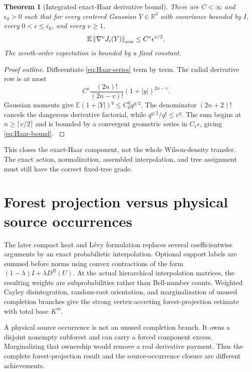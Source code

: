 \documentclass[11pt,oneside,openany]{book}
\newtheorem{theorem}{Theorem}[chapter]
\theoremstyle{definition}
\theoremstyle{remark}
\newcommand{\R}{\mathbb R}
\newcommand{\E}{\mathbb E}
\newcommand{\norm}[1]{\left\lVert#1\right\rVert}
\newcommand{\src}[2]{\cite[#2]{#1}}
\begin{document}
\begin{theorem}[Integrated exact-Haar derivative bound]\label{thm:Haar}
There are $C<\infty$ and $\epsilon_0>0$ such that for every centered Gaussian $Y\in\R^3$ with covariance bounded by $I$, every $0<\epsilon\le\epsilon_0$, and every $v\ge1$,
\begin{equation}\label{eq:Haar-bound}
\E\norm{\nabla^vJ_\epsilon(Y)}_{\rm row}
\le C^v\epsilon^{v/2}.
\end{equation}
The zeroth-order expectation is bounded by a fixed constant.
\end{theorem}
\begin{proof}[Proof outline]
Differentiate \cref{eq:Haar-series} term by term. The radial derivative row is at most
\[
C^v\frac{(2n)!}{(2n-v)!}(1+|y|)^{2n-v}.
\]
Gaussian moments give $\E(1+|Y|)^q\le C_0^q q^{q/2}$. The denominator $(2n+2)!$ cancels the dangerous derivative factorial, while $q^{q/2}/q!\le e^q$. The sum begins at $n\ge\lceil v/2\rceil$ and is bounded by a convergent geometric series in $C_1\epsilon$, giving \cref{eq:Haar-bound}. \src{F5}{V12}
\end{proof}

This closes the exact-Haar component, not the whole Wilson-density transfer. The exact action, normalization, assembled interpolation, and tree assignment must still have the correct fixed-tree grade.

\section{Forest projection versus physical source occurrences}
The later compact heat and L\'evy formulation replaces several coefficientwise arguments by an exact probabilistic interpolation. Optional support labels are summed before norms using convex contractions of the form $(1-\lambda)I+\lambda D^R(U)$. At the actual hierarchical interpolation matrices, the resulting weights are subprobabilities rather than Bell-number counts. Weighted Cayley disintegration, random-root orientation, and marginalization of unused completion branches give the strong vertex-accreting forest-projection estimate with total base $K^m$.

A physical source occurrence is not an unused completion branch. It owns a disjoint nonempty subforest and can carry a forced component excess. Marginalizing that ownership would remove a real derivative payment. Thus the complete forest-projection result and the source-occurrence closure are different achievements. \src{F6}{V1--V7}
\end{document}
